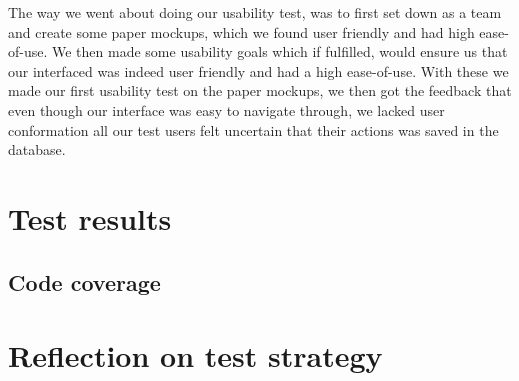 The way we went about doing our usability test, was to first set down as a team and create some paper mockups, which we found user friendly and had high ease-of-use. We then made some usability goals which if fulfilled, would ensure us that our interfaced was indeed user friendly and had a high ease-of-use. With these we made our first usability test on the paper mockups, we then got the feedback that even though our interface was easy to navigate through, we lacked user conformation all our test users felt uncertain that their actions was saved in the database.


\section{Test results}
\label{Testing_Results}

\subsection{Code coverage}
\label{Testing_Results_Coverage}

\section{Reflection on test strategy}
\label{Testing_Reflection}
